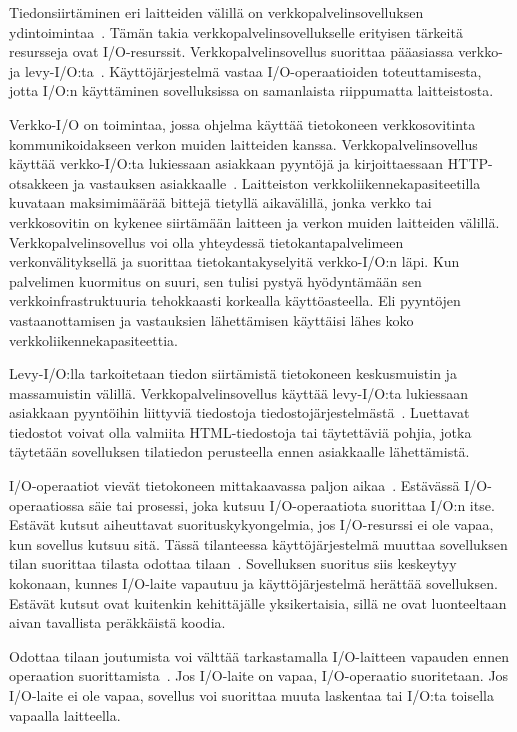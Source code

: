 \documentclass[finnish]{tktltiki2}%
\theoremstyle{definition}
\theoremstyle{remark}
\begin{document}
Tiedonsiirtäminen eri laitteiden välillä on verkkopalvelinsovelluksen
ydintoimintaa~\cite{pai_flash_1999}.
Tämän takia verkkopalvelinsovellukselle erityisen tärkeitä resursseja ovat
I/O-resurssit.
Verkkopalvelinsovellus suorittaa pääasiassa verkko-ja levy-I/O:ta~\cite{pai_flash_1999}.
Käyttöjärjestelmä vastaa I/O-operaatioiden toteuttamisesta,
jotta I/O:n käyttäminen sovelluksissa on samanlaista
riippumatta laitteistosta.

Verkko-I/O on toimintaa, jossa ohjelma käyttää tietokoneen
verkkosovitinta kommunikoidakseen verkon muiden laitteiden kanssa.
Verkkopalvelinsovellus käyttää verkko-I/O:ta lukiessaan
asiakkaan pyyntöjä ja kirjoittaessaan HTTP-otsakkeen ja
vastauksen asiakkaalle~\cite{pai_flash_1999}.
Laitteiston verkkoliikennekapasiteetilla kuvataan maksimimäärää bittejä tietyllä aikavälillä,
jonka verkko tai verkkosovitin on kykenee siirtämään laitteen ja verkon muiden laitteiden välillä.
Verkkopalvelinsovellus voi olla yhteydessä tietokantapalvelimeen
verkonvälityksellä ja suorittaa tietokantakyselyitä verkko-I/O:n läpi.
Kun palvelimen kuormitus on suuri, sen tulisi pystyä hyödyntämään
sen verkkoinfrastruktuuria tehokkaasti korkealla käyttöasteella. Eli
pyyntöjen vastaanottamisen ja vastauksien lähettämisen käyttäisi
lähes koko verkkoliikennekapasiteettia.

Levy-I/O:lla tarkoitetaan tiedon siirtämistä
tietokoneen keskusmuistin ja massamuistin välillä.
Verkkopalvelinsovellus käyttää levy-I/O:ta lukiessaan
asiakkaan pyyntöihin liittyviä tiedostoja tiedostojärjestelmästä~\cite{pai_flash_1999}.
Luettavat tiedostot voivat olla valmiita HTML-tiedostoja tai täytettäviä
pohjia, jotka täytetään sovelluksen tilatiedon perusteella ennen
asiakkaalle lähettämistä.

I/O-operaatiot vievät tietokoneen mittakaavassa paljon
aikaa~\cite{pai_flash_1999}. Estävässä I/O-operaatiossa säie tai prosessi,
joka kutsuu I/O-operaatiota suorittaa I/O:n itse.
Estävät kutsut aiheuttavat suorituskykyongelmia, jos
I/O-resurssi ei ole vapaa, kun sovellus kutsuu sitä.
Tässä tilanteessa käyttöjärjestelmä muuttaa sovelluksen
tilan suorittaa tilasta odottaa tilaan~\cite{stallings_operating_2018}.
Sovelluksen suoritus
siis keskeytyy kokonaan, kunnes I/O-laite vapautuu ja käyttöjärjestelmä
herättää sovelluksen.
Estävät kutsut ovat kuitenkin kehittäjälle yksikertaisia, sillä
ne ovat luonteeltaan aivan tavallista peräkkäistä
koodia.

Odottaa tilaan joutumista voi välttää tarkastamalla
I/O-laitteen vapauden ennen operaation suorittamista~\cite{schmidt_reactor:_1995}.
Jos
I/O-laite on vapaa, I/O-operaatio suoritetaan. Jos I/O-laite
ei ole vapaa, sovellus voi suorittaa muuta laskentaa tai I/O:ta
toisella vapaalla laitteella.
\end{document}
